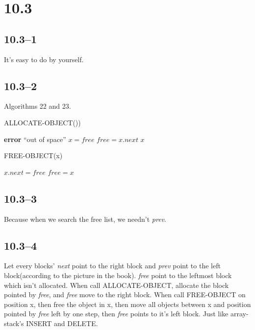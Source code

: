 \documentclass{article}
\begin{document}
\section*{10.3}
\subsection*{10.3--1}
It's easy to do by yourself.

\subsection*{10.3--2}
Algorithms 22 and 23.
\begin{algorithm}
  \caption{ALLOCATE-OBJECT())}
  \begin{algorithmic}[1]
    \STATE \textbf{error} ``out of space''
    \ELSE
    \STATE $x = free$
    \STATE $free = x.next$
    \RETURN $x$
    \ENDIF
  \end{algorithmic}
\end{algorithm}

\begin{algorithm}
  \caption{FREE-OBJECT(x)}
  \begin{algorithmic}[1]
    \STATE $x.next = free$
    \STATE $free = x$
  \end{algorithmic}
\end{algorithm}

\subsection*{10.3--3}
Because when we search the free list, we needn't \textit{prev}.

\subsection*{10.3--4}
Let every blocks' \textit{next} point to the right block and \textit{prev}
point to the left block(according to the picture in the book). \textit{free} point to the leftmost block which isn't allocated. When call ALLOCATE-OBJECT,
allocate the block pointed by \textit{free}, and \textit{free} move to the right block. When call FREE-OBJECT on position x, then free the object in x, then move all objects between x and position pointed by \textit{free} left by one step, then \textit{free} points to it's left block. Just like array-stack's INSERT and DELETE.
\end{document}
